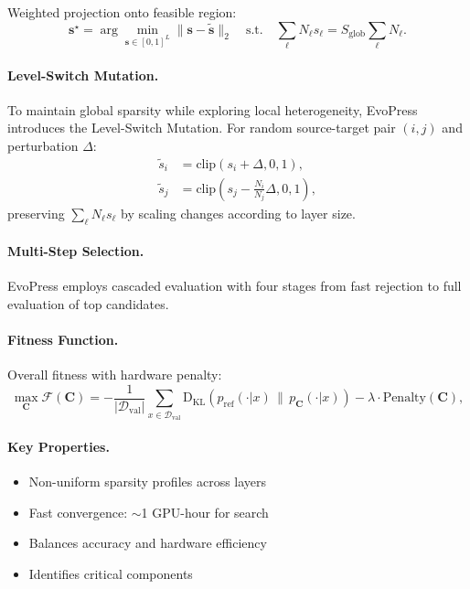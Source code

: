 Weighted projection onto feasible region:
\begin{equation}
	\mathbf{s}^\star = \arg\min_{\mathbf{s}\in[0,1]^L} \|\mathbf{s}-\tilde{\mathbf{s}}\|_2 \quad 
	\text{s.t.} \quad \sum_\ell N_\ell s_\ell = S_{\text{glob}}\sum_\ell N_\ell.
\end{equation}

\paragraph{Level-Switch Mutation.}
To maintain global sparsity while exploring local heterogeneity, EvoPress introduces the Level-Switch Mutation. For random source-target pair $(i,j)$ and perturbation $\Delta$:
\begin{align}
	\tilde{s}_i &= \text{clip}(s_i + \Delta, 0, 1), \\
	\tilde{s}_j &= \text{clip}\left(s_j - \frac{N_i}{N_j}\Delta, 0, 1\right),
\end{align}
preserving $\sum_\ell N_\ell s_\ell$ by scaling changes according to layer size.

\paragraph{Multi-Step Selection.}
EvoPress employs cascaded evaluation with four stages from fast rejection to full evaluation of top candidates.

\paragraph{Fitness Function.}
Overall fitness with hardware penalty:
\begin{equation}
	\max_{\mathbf{C}} \mathcal{F}(\mathbf{C}) 
	= -\frac{1}{|\mathcal{D}_{\text{val}}|}\sum_{x\in\mathcal{D}_{\text{val}}}
	\text{D}_{\text{KL}}\left(p_{\text{ref}}(\cdot|x)\,\|\,p_{\mathbf{C}}(\cdot|x)\right)
	- \lambda \cdot \text{Penalty}(\mathbf{C}),
\end{equation}

\paragraph{Key Properties.}
\begin{itemize}[nosep]
	\item Non-uniform sparsity profiles across layers
	\item Fast convergence: $\sim$1 GPU-hour for search
	\item Balances accuracy and hardware efficiency
	\item Identifies critical components
\end{itemize}

